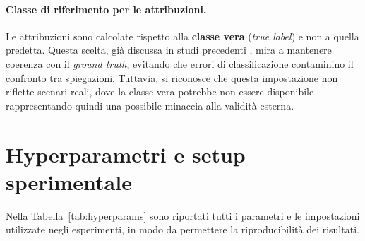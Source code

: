 \documentclass[12pt,a4paper,oneside]{report}
\numberwithin{figure}{chapter}
\numberwithin{table}{chapter}
\begin{document}
\paragraph{Classe di riferimento per le attribuzioni.}
Le attribuzioni sono calcolate rispetto alla \textbf{classe vera} (\textit{true
      label}) e non a quella predetta. Questa scelta, già discussa in studi
precedenti \citep{arras2019evaluating}, mira a mantenere coerenza con il
\textit{ground truth}, evitando che errori di classificazione contaminino il
confronto tra spiegazioni. Tuttavia, si riconosce che questa impostazione non
riflette scenari reali, dove la classe vera potrebbe non essere disponibile —
rappresentando quindi una possibile minaccia alla validità esterna.

\section{Hyperparametri e setup sperimentale}

Nella Tabella~\ref{tab:hyperparams} sono riportati tutti i parametri e le
impostazioni utilizzate negli esperimenti, in modo da permettere la
riproducibilità dei risultati.
\end{document}
